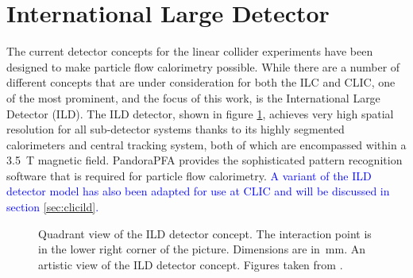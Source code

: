 \section{International Large Detector}
\label{sec:ild}
The current detector concepts for the linear collider experiments have been designed to make particle flow calorimetry possible.  While there are a number of different concepts that are under consideration for both the ILC and CLIC, one of the most prominent, and the focus of this work, is the International Large Detector (ILD).  The ILD detector, shown in figure \ref{fig:ild}, achieves very high spatial resolution for all sub-detector systems thanks to its highly segmented calorimeters and central tracking system, both of which are encompassed within a 3.5~T magnetic field.  PandoraPFA \cite{arXiv:1209.4039, arXiv:0907.3577} provides the sophisticated pattern recognition software that is required for particle flow calorimetry.  \textcolor{blue}{A variant of the ILD detector model has also been adapted for use at CLIC and will be discussed in section \ref{sec:clicild}.}

\begin{figure}[h!]
\centering
{}
\caption[\protect{} Quadrant view of the ILD detector concept.  The interaction point is in the lower right corner of the picture.  Dimensions are in~mm.  \protect{} An artistic view of the ILD detector concept.  Figures taken from  \cite{Behnke:2013lya}.]{\protect{} Quadrant view of the ILD detector concept.  The interaction point is in the lower right corner of the picture.  Dimensions are in~mm.  \protect{} An artistic view of the ILD detector concept.  Figures taken from  \cite{Behnke:2013lya}.}
\label{fig:ild}
\end{figure} 

